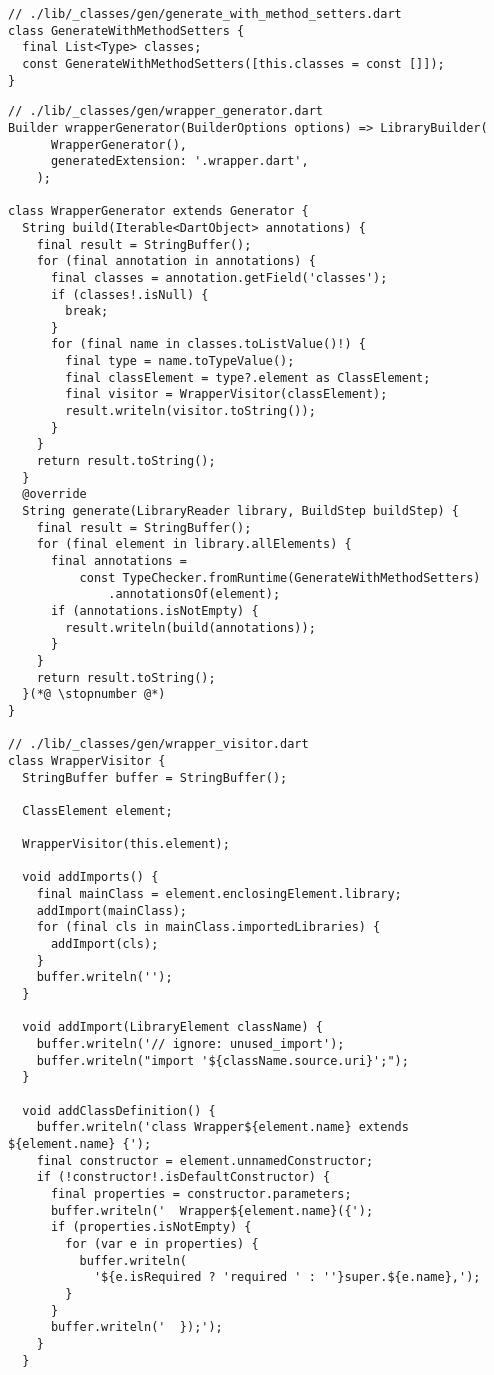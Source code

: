 \begin{lstlisting}
// ./lib/_classes/gen/generate_with_method_setters.dart
class GenerateWithMethodSetters {
  final List<Type> classes;
  const GenerateWithMethodSetters([this.classes = const []]);
}
\end{lstlisting}
\begin{lstlisting}
// ./lib/_classes/gen/wrapper_generator.dart
Builder wrapperGenerator(BuilderOptions options) => LibraryBuilder(
      WrapperGenerator(),
      generatedExtension: '.wrapper.dart',
    );

class WrapperGenerator extends Generator {
  String build(Iterable<DartObject> annotations) {
    final result = StringBuffer();
    for (final annotation in annotations) {
      final classes = annotation.getField('classes');
      if (classes!.isNull) {
        break;
      }
      for (final name in classes.toListValue()!) {
        final type = name.toTypeValue();
        final classElement = type?.element as ClassElement;
        final visitor = WrapperVisitor(classElement);
        result.writeln(visitor.toString());
      }
    }
    return result.toString();
  }
  @override
  String generate(LibraryReader library, BuildStep buildStep) {
    final result = StringBuffer();
    for (final element in library.allElements) {
      final annotations =
          const TypeChecker.fromRuntime(GenerateWithMethodSetters)
              .annotationsOf(element);
      if (annotations.isNotEmpty) {
        result.writeln(build(annotations));
      }
    }
    return result.toString();
  }(*@ \stopnumber @*)
}

// ./lib/_classes/gen/wrapper_visitor.dart
class WrapperVisitor {
  StringBuffer buffer = StringBuffer();

  ClassElement element;

  WrapperVisitor(this.element);

  void addImports() {
    final mainClass = element.enclosingElement.library;
    addImport(mainClass);
    for (final cls in mainClass.importedLibraries) {
      addImport(cls);
    }
    buffer.writeln('');
  }

  void addImport(LibraryElement className) {
    buffer.writeln('// ignore: unused_import');
    buffer.writeln("import '${className.source.uri}';");
  }

  void addClassDefinition() {
    buffer.writeln('class Wrapper${element.name} extends ${element.name} {');
    final constructor = element.unnamedConstructor;
    if (!constructor!.isDefaultConstructor) {
      final properties = constructor.parameters;
      buffer.writeln('  Wrapper${element.name}({');
      if (properties.isNotEmpty) {
        for (var e in properties) {
          buffer.writeln(
            '${e.isRequired ? 'required ' : ''}super.${e.name},');
        }
      }
      buffer.writeln('  });');
    }
  }


\end{lstlisting}
